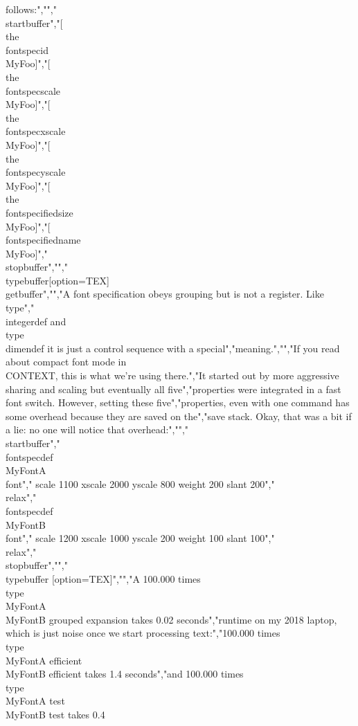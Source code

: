 follows:","","\\startbuffer","[\\the\\fontspecid       \\MyFoo]","[\\the\\fontspecscale    \\MyFoo]","[\\the\\fontspecxscale   \\MyFoo]","[\\the\\fontspecyscale   \\MyFoo]","[\\the\\fontspecifiedsize\\MyFoo]","[\\fontspecifiedname    \\MyFoo]","\\stopbuffer","","\\typebuffer[option=TEX] \\getbuffer","","A font specification obeys grouping but is not a register. Like \\type","{\\integerdef} and \\type {\\dimendef} it is just a control sequence with a special","meaning.","","If you read about compact font mode in \\CONTEXT, this is what we're using there.","It started out by more aggressive sharing and scaling but eventually all five","properties were integrated in a fast font switch. However, setting these five","properties, even with one command has some overhead because they are saved on the","save stack. Okay, that was a bit if a lie: no one will notice that overhead:","","\\startbuffer","\\fontspecdef \\MyFontA \\font","    scale 1100 xscale 2000 yscale 800 weight 200 slant 200","\\relax","\\fontspecdef \\MyFontB \\font","    scale 1200 xscale 1000 yscale 200 weight 100 slant 100","\\relax","\\stopbuffer","","\\typebuffer [option=TEX]","","A 100.000 times \\type {{\\MyFontA \\MyFontB}} grouped expansion takes 0.02 seconds","runtime on my 2018 laptop, which is just noise once we start processing text:","100.000 times \\type {{\\MyFontA efficient \\MyFontB efficient}} takes 1.4 seconds","and 100.000 times \\type {{\\MyFontA test \\MyFontB test}} takes 0.4 
